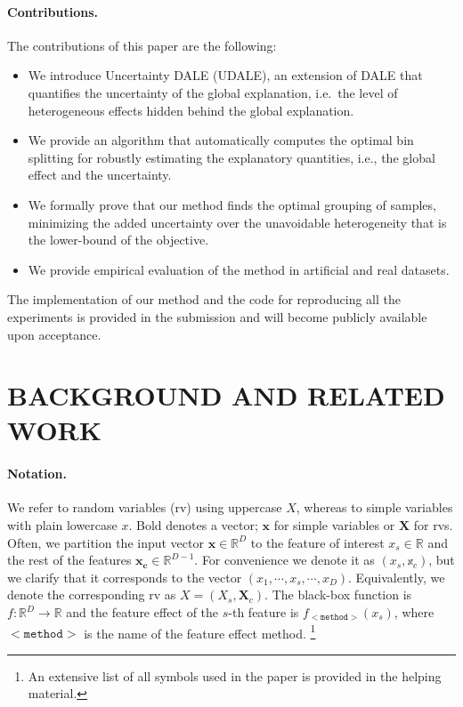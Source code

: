 \documentclass[twoside]{article}
\newcommand{\xc}{\mathbf{x_c}}
\newcommand{\xb}{\mathbf{x}}
\begin{document}
\paragraph{Contributions.} The contributions of this paper are the following:

\begin{itemize}
  \item We introduce Uncertainty DALE (UDALE), an extension of DALE that quantifies the uncertainty of the global explanation, i.e.~the level of heterogeneous effects hidden behind the global explanation.\item We provide an algorithm that automatically computes the optimal bin splitting for robustly estimating the explanatory quantities, i.e., the global effect and the uncertainty. 
  \item We formally prove that our method finds the optimal grouping of samples, minimizing the added uncertainty over the unavoidable heterogeneity that is the lower-bound of the objective.
  \item We provide empirical evaluation of the method in artificial and real datasets.
\end{itemize}


The implementation of our method and the code for reproducing all the
experiments is provided in the submission and will become publicly
available upon acceptance.


\section{BACKGROUND AND RELATED WORK}

\paragraph{Notation.}

We refer to random variables (rv) using uppercase \( X \), whereas to
simple variables with plain lowercase \( x \). Bold denotes a vector;
\( \xb \) for simple variables or \(\mathbf{X}\) for rvs. Often, we
partition the input vector \(\xb \in \mathbb{R}^D\) to the feature of
interest \(x_s \in \mathbb{R} \) and the rest of the features
\(\xc \in \mathbb{R}^{D-1}\). For convenience we denote it as
\((x_s, \mathbb{x}_c)\), but we clarify that it corresponds to the vector
\((x_1, \cdots , x_s, \cdots, x_D)\). Equivalently, we denote the
corresponding rv as \(X = (X_s, \mathbf{X}_c)\). The black-box
function is \(f : \mathbb{R}^D \rightarrow \mathbb{R}\) and the
feature effect of the \(s\)-th feature is
\(f_{\mathtt{<method>}}(x_s)\), where \(\mathtt{<method>}\) is the
name of the feature effect method. \footnote{An extensive list of all
  symbols used in the paper is provided in the helping material.}
\end{document}
